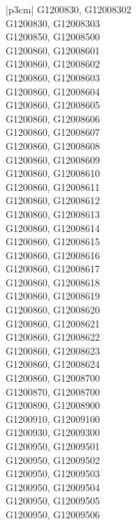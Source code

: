 \begin{customLongTable}{ |p{3cm}| }
G1200830, G12008302 \\ \hline
G1200830, G12008303 \\ \hline
G1200850, G12008500 \\ \hline
G1200860, G12008601 \\ \hline
G1200860, G12008602 \\ \hline
G1200860, G12008603 \\ \hline
G1200860, G12008604 \\ \hline
G1200860, G12008605 \\ \hline
G1200860, G12008606 \\ \hline
G1200860, G12008607 \\ \hline
G1200860, G12008608 \\ \hline
G1200860, G12008609 \\ \hline
G1200860, G12008610 \\ \hline
G1200860, G12008611 \\ \hline
G1200860, G12008612 \\ \hline
G1200860, G12008613 \\ \hline
G1200860, G12008614 \\ \hline
G1200860, G12008615 \\ \hline
G1200860, G12008616 \\ \hline
G1200860, G12008617 \\ \hline
G1200860, G12008618 \\ \hline
G1200860, G12008619 \\ \hline
G1200860, G12008620 \\ \hline
G1200860, G12008621 \\ \hline
G1200860, G12008622 \\ \hline
G1200860, G12008623 \\ \hline
G1200860, G12008624 \\ \hline
G1200860, G12008700 \\ \hline
G1200870, G12008700 \\ \hline
G1200890, G12008900 \\ \hline
G1200910, G12009100 \\ \hline
G1200930, G12009300 \\ \hline
G1200950, G12009501 \\ \hline
G1200950, G12009502 \\ \hline
G1200950, G12009503 \\ \hline
G1200950, G12009504 \\ \hline
G1200950, G12009505 \\ \hline
G1200950, G12009506 \\ \hline

\end{customLongTable}
